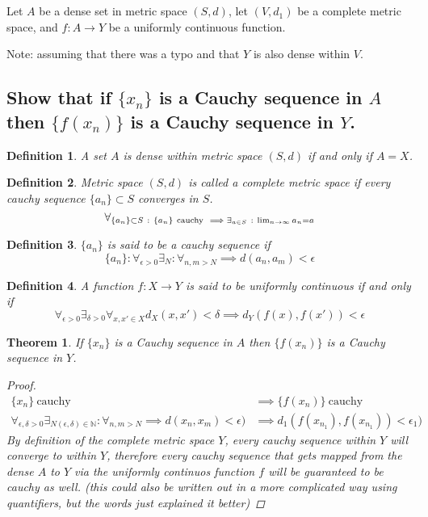 \documentclass[]{article}
\newcommand{\N}{\mathbb{N}}
\newcommand{\st}{\ : \ }
\newtheorem{definition}{Definition}
\newtheorem{theorem}{Theorem}
\begin{document}
\newpage
\section{}
Let $A$ be a dense set in metric space $(S,d)$, let $(V,d_1)$ be a complete metric space, and $f : A \to Y$ be a uniformly continuous function.

Note: assuming that there was a typo and that $Y$ is also dense within $V$.

\subsection{Show that if $\{x_n\}$ is a Cauchy sequence in $A$ then $\{f(x_n)\}$ is a Cauchy sequence in $Y$.}

\begin{definition}
    A set $A$ is \emph{dense} within metric space $(S,d)$ if and only if $A = X$.
\end{definition}

\begin{definition}\label{def:complete}
    Metric space $(S,d)$ is called a \emph{complete metric space} if every cauchy sequence $\{a_n\}\subset S$ converges in $S$.
    \[\forall_{\{a_n\} \subset S \st \{a_n\} \ \textnormal{cauchy} \ \implies \exists_{a \in S} \st \lim_{n\to\infty} a_n = a}\]
\end{definition}

\begin{definition}
    $\{a_n\}$ is said to be a \emph{cauchy} sequence if
    \[\{a_n\} : \forall_{\epsilon>0} \exists_{N} : \forall_{n,m > N} \implies d(a_n,a_m) < \epsilon\]
\end{definition}

\begin{definition}
    A function $f : X \to Y$ is said to be \emph{uniformly continuous} if and only if
    \[\forall_{\epsilon>0} \exists_{\delta>0} \forall_{x,x' \in X} d_X(x,x') < \delta \implies d_Y(f(x), f(x')) < \epsilon\]
\end{definition}

\begin{theorem}
    If $\{x_n\}$ is a Cauchy sequence in $A$ then $\{f(x_n)\}$ is a Cauchy sequence in $Y$.
    \begin{proof}
        \begin{align*}
            \{x_n\} \ \text{cauchy} &\implies \{f(x_n)\} \ \text{cauchy}\\
            \forall_{\epsilon,\delta>0} \exists_{N(\epsilon,\delta) \in \N} : \forall_{n,m > N} \implies d(x_n,x_m) < \epsilon)
            &\implies d_1(f(x_{n_1}),f(x_{n_1})) < \epsilon_1)
        \end{align*}
        By definition of the complete metric space $Y$, every cauchy sequence within $Y$ will converge to within $Y$, therefore every cauchy sequence that gets mapped from the dense $A$ to $Y$ via the uniformly continuos function $f$ will be guaranteed to be cauchy as well.
        (this could also be written out in a more complicated way using quantifiers, but the words just explained it better)
    \end{proof}
\end{theorem}
\end{document}
